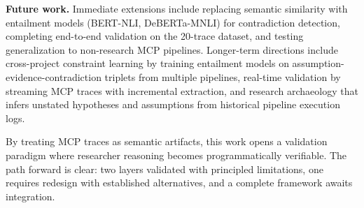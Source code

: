 \textbf{Future work.} Immediate extensions include replacing semantic similarity with entailment models (BERT-NLI, DeBERTa-MNLI) for contradiction detection, completing end-to-end validation on the 20-trace dataset, and testing generalization to non-research MCP pipelines. Longer-term directions include cross-project constraint learning by training entailment models on assumption-evidence-contradiction triplets from multiple pipelines, real-time validation by streaming MCP traces with incremental extraction, and research archaeology that infers unstated hypotheses and assumptions from historical pipeline execution logs.

By treating MCP traces as semantic artifacts, this work opens a validation paradigm where researcher reasoning becomes programmatically verifiable. The path forward is clear: two layers validated with principled limitations, one requires redesign with established alternatives, and a complete framework awaits integration.
